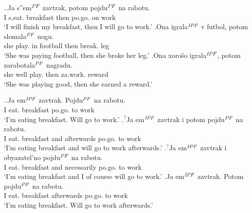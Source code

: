 \ex.\ag.\label{breakfast:potom}Ja s''em$^{\mathit{PF}}$ zavtrak, potom pojdu$^{\mathit{PF}}$ na rabotu.\\
I s.eat. breakfast then po.go. on work\\
\vspace{0.5em}
`I will finish my breakfast, then I will go to work.'
\bg.\label{football:potom}Ona igrala$^{\mathit{IPF}}$ v futbol, potom slomala$^{\mathit{PF}}$ nogu.\\
she play. in football then break. leg\\
\vspace{0.5em}
`She was paying football, then she broke her leg.'
\bg.\label{ex:cause:potom}Ona xoro\v{s}o igrala$^{\mathit{IPF}}$, potom zarabotala$^{\mathit{PF}}$ nagradu.\\
she well play. then za.work. reward\\
\vspace{0.5em}
`She was playing good, then she earned a reward.'

\ex.\label{test3}\ag.\label{test31}Ja em$^{\mathit{IPF}}$ zavtrak. Pojdu$^{\mathit{PF}}$ na rabotu.\\ 
I eat. breakfast po.go. to work\\
\vspace{0.5em}
`I'm eating breakfast. Will go to work.'
\bg.\label{test32}$^?$Ja em$^{\mathit{IPF}}$ zavtrak i potom pojdu$^{\mathit{PF}}$ na rabotu.\\ 
I eat. breakfast and afterwards po.go. to work\\
\vspace{0.5em}
`I'm eating breakfast and will go to work afterwards.'
\bg.\label{test33}$^?$Ja em$^{\mathit{IPF}}$ zavtrak i obyazatel’no pojdu$^{\mathit{PF}}$ na rabotu.\\
I eat. breakfast and necessarily po.go. to work\\
\vspace{0.5em}
`I'm eating breakfast and I of course will go to work.'
\bg.\label{test34}Ja em$^{\mathit{IPF}}$ zavtrak. Potom pojdu$^{\mathit{PF}}$ na rabotu.\\
I eat. breakfast afterwards po.go. to work\\
\vspace{0.5em}
`I'm eating breakfast. Will go to work afterwards.'

